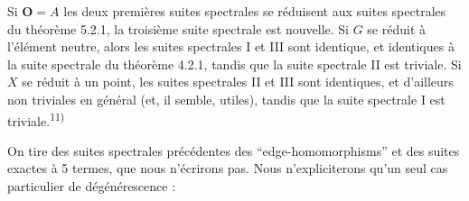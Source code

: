 Si ${\mathbf O}=A$ les deux premières suites spectrales se réduisent aux suites
spectrales du théorème 5.2.1, la troisième suite spectrale est nouvelle. Si
$G$ se réduit à l'élément neutre, alors les suites spectrales I et III sont
identique, et identiques à la suite spectrale du théorème 4.2.1, tandis que la
suite spectrale II est triviale. Si $X$ se réduit à un point, les suites
spectrales II et III sont identiques, et d'ailleurs non triviales en général
(et, il semble, utiles), tandis que la suite spectrale I est
triviale.\textsuperscript{11)}

On tire des suites spectrales précédentes des ``edge-homomorphisms'' et des
suites exactes à 5 termes, que nous n'écrirons pas.
Nous n'expliciterons qu'un seul cas particulier de dégénérescence :

